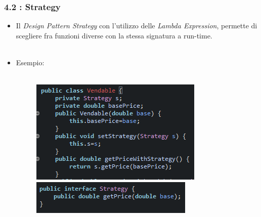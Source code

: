 \documentclass{beamer}
\begin{document}

\begin{frame}
	\frametitle{\textbf{4.2 : Strategy}}
	\begin{itemize}
		\item
			Il \textit{Design Pattern Strategy} con l'utilizzo delle \textit{Lambda Expression}, permette di scegliere fra funzioni diverse con la stessa signatura a run-time.\\\
		\item
			Esempio:\\\
			\begin{figure}
				\centering
				\includegraphics[width=0.5\linewidth]{image/strategy.png}
				\label{fig:target}
				\centering
				\includegraphics[width=0.4\linewidth]{image/interfaceStrategy.png}
				\label{fig:target}
			\end{figure}		
	\end{itemize}
\end{frame}

\end{document}
